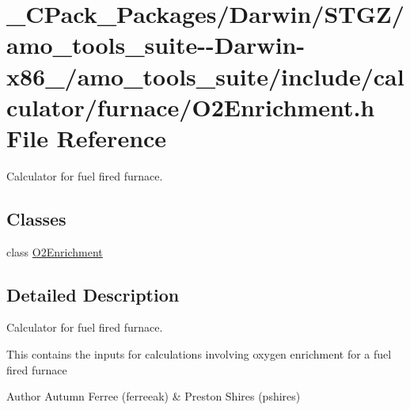 \hypertarget{___c_pack___packages_2_darwin_2_s_t_g_z_2amo__tools__suite--_darwin-x86__64_2amo__tools__suite_2d0f965568526e5e5911c012959c0c043}{}\section{\+\_\+\+C\+Pack\+\_\+\+Packages/\+Darwin/\+S\+T\+G\+Z/amo\+\_\+tools\+\_\+suite-\/-\/\+Darwin-\/x86\+\_/amo\+\_\+tools\+\_\+suite/include/calculator/furnace/\+O2\+Enrichment.h File Reference}
\label{___c_pack___packages_2_darwin_2_s_t_g_z_2amo__tools__suite--_darwin-x86__64_2amo__tools__suite_2d0f965568526e5e5911c012959c0c043}


Calculator for fuel fired furnace.  


\subsection*{Classes}
\begin{DoxyCompactItemize}
\item 
class \hyperlink{class_o2_enrichment}{O2\+Enrichment}
\end{DoxyCompactItemize}


\subsection{Detailed Description}
Calculator for fuel fired furnace. 

This contains the inputs for calculations involving oxygen enrichment for a fuel fired furnace

\begin{DoxyAuthor}{Author}
Autumn Ferree (ferreeak) \& Preston Shires (pshires) 
\end{DoxyAuthor}
